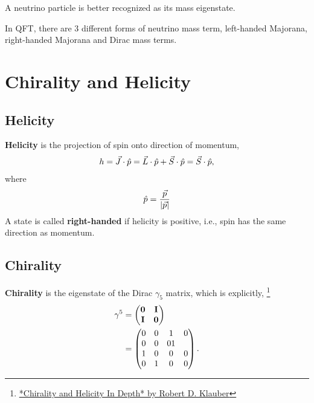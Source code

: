 \documentclass[letterpaper,12pt,english]{sphinxmanual}
\begin{document}
A neutrino particle is better recognized as its mass eigenstate.

In QFT, there are 3 different forms of neutrino mass term, left-handed Majorana, right-handed Majorana and Dirac mass terms.


\section{Chirality and Helicity}
\label{preliminary:chirality-and-helicity}

\subsection{Helicity}
\label{preliminary:index-0}\label{preliminary:helicity}
\textbf{Helicity} is the projection of spin onto direction of momentum,
\begin{gather}
\begin{split}h = \vec J\cdot\hat p = \vec L\cdot\hat p + \vec S\cdot \hat p = \vec S\cdot \hat p,\end{split}\notag
\end{gather}
where
\begin{gather}
\begin{split}\hat p = \frac{\vec p}{\left|\vec p\right|}\end{split}\notag
\end{gather}
A state is called \textbf{right-handed} if helicity is positive, i.e., spin has the same direction as momentum.


\subsection{Chirality}
\label{preliminary:chirality}\label{preliminary:index-1}
\textbf{Chirality} is the eigenstate of the Dirac \(\gamma_5\) matrix, which is explicitly, \footnote{
\href{http://www.quantumfieldtheory.info/ChiralityandHelicityindepth.htm}{*Chirality and Helicity In Depth* by Robert D. Klauber}
}
\begin{gather}
\begin{split}\gamma^5 &= \begin{pmatrix} \mathbf 0 & \mathbf I \\ \mathbf I & \mathbf 0 \end{pmatrix} \\
& = \begin{pmatrix} 0 & 0 & 1 & 0 \\ 0 & 0 & 0 1 \\ 1 & 0 & 0 & 0 \\ 0 & 1 & 0 & 0  \end{pmatrix}.\end{split}\notag
\end{gather}
\end{document}
